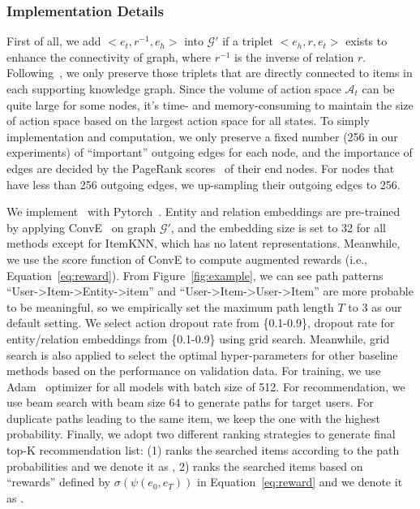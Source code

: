 \subsubsection{Implementation Details} First of all, we add $<e_t, r^{-1}, e_h>$ into $\mathcal{G}'$ if a triplet $<e_h, r, e_t>$ exists to enhance the connectivity of graph, where $r^{-1}$ is the inverse of relation $r$.
Following~\cite{Cao_2019}, we only preserve those triplets that are directly connected to items in each supporting knowledge graph.
Since the volume of action space $\mathcal{A}_t$ can be quite large for some nodes, it's time- and memory-consuming to maintain the size of action space based on the largest action space for all states. To simply implementation and computation, we only preserve a fixed number (256 in our experiments) of ``important'' outgoing edges for each node, and the importance of edges are decided by the PageRank scores~\cite{Pageetal98} of their end nodes. For nodes that have less than 256 outgoing edges, we up-sampling their outgoing edges to 256. 

We implement \name\ with Pytorch~\cite{paszke2017automatic}. 
Entity and relation embeddings are pre-trained by applying ConvE~\cite{dettmers2018convolutional}
on graph $\mathcal{G}'$,
and the embedding size is set to 32 for all methods except for ItemKNN, which has no latent representations. Meanwhile, we use the score function of ConvE to compute augmented rewards (i.e., Equation~\ref{eq:reward}). 
From Figure~\ref{fig:example}, we can see path patterns ``User->Item->Entity->item'' and ``User->Item->User->Item'' are more probable to be meaningful, so we empirically set the maximum path length $T$ to 3 as our default setting. We select action dropout rate from \{0.1-0.9\}, dropout rate for entity/relation embeddings from \{0.1-0.9\} using grid search.
Meanwhile, grid search is also applied to select the optimal hyper-parameters for other baseline methods based on the performance on validation data.
For training, we use Adam~\cite{kingma2014adam} optimizer for all models with batch size of 512.
For recommendation, we use beam search with beam size 64 to generate paths for target users. For duplicate paths leading to the same item, we keep the one with the highest probability. 
Finally, we adopt two different ranking strategies to generate final top-K recommendation list: (1) ranks the searched items according to the path probabilities and we denote it as \name, 2) ranks the searched items based on ``rewards'' defined by $\sigma(\psi(e_0, e_T))$ in Equation~\ref{eq:reward} and we denote it as \name*.



